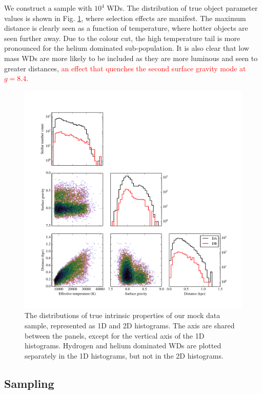 \documentclass[fleqn,usenatbib]{mnras}
\newcommand{\changes}[1]{\textcolor{red}{#1}}
\begin{document}
We construct a sample with $10^4$ WDs. The distribution of true object parameter values is shown in Fig. \ref{fig:10000WDs}, where selection effects are manifest. The maximum distance is clearly seen as a function of temperature, where hotter objects are seen further away. Due to the colour cut, the high temperature tail is more pronounced for the helium dominated sub-population. It is also clear that low mass WDs are more likely to be included as they are more luminous and seen to greater distances, \changes{an effect that quenches the second surface gravity mode at $g=8.4$.}
\begin{figure}
	\includegraphics[width=.9\textwidth]{sample_corner.pdf}
    \caption{The distributions of true intrinsic properties of our mock data sample, represented as 1D and 2D histograms. The axis are shared between the panels, except for the vertical axis of the 1D histograms. Hydrogen and helium dominated WDs are plotted separately in the 1D histograms, but not in the 2D histograms.}
    \label{fig:10000WDs}
\end{figure}


\subsection{Sampling}
\end{document}
